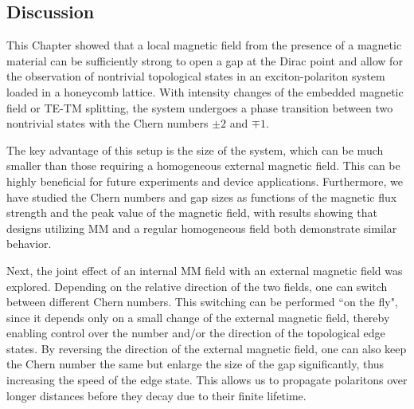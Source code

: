 

\subsection{Discussion}
This Chapter showed that a local magnetic field from the presence of a magnetic material can be sufficiently strong to open a gap at the Dirac point and allow for the observation of nontrivial topological states in an exciton-polariton system loaded in a honeycomb lattice.
With intensity changes of the embedded magnetic field or TE-TM splitting, the system undergoes a phase transition between two nontrivial states with the Chern numbers $\pm2$ and $\mp1$.

The key advantage of this setup is the size of the system, which can be much smaller than those requiring a homogeneous external magnetic field.
This can be highly beneficial for future experiments and device applications.
Furthermore, we have studied the Chern numbers and gap sizes as functions of the magnetic flux strength and the peak value of the magnetic field, with results showing that designs utilizing MM and a regular homogeneous field both demonstrate similar behavior.

Next, the joint effect of an internal MM field with an external magnetic field was explored.
Depending on the relative direction of the two fields, one can switch between different Chern numbers.
This switching can be performed ``on the fly", since it depends only on a small change of the external magnetic field, thereby enabling control over the number and/or the direction of the topological edge states.
By reversing the direction of the external magnetic field, one can also keep the Chern number the same but enlarge the size of the gap significantly, thus increasing the speed of the edge state.
This allows us to propagate polaritons over longer distances before they decay due to their finite lifetime.
